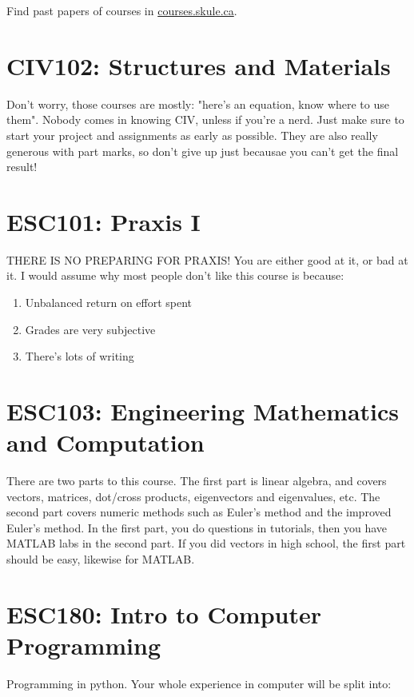 Find past papers of courses in \url{courses.skule.ca}.

\section{CIV102: Structures and Materials}

Don't worry, those courses are mostly: "here's an equation, know where to use them". Nobody comes in knowing CIV, unless if you're a nerd. Just make sure to start your project and assignments as early as possible. They are also really generous with part marks, so don't give up just becausae you can't get the final result!

\section{ESC101: Praxis I}

THERE IS NO PREPARING FOR PRAXIS! You are either good at it, or bad at it. I would assume why most people don't like this course is because:

\begin{enumerate}
    \item Unbalanced return on effort spent
    \item Grades are very subjective
    \item There's lots of writing
\end{enumerate}

\section{ESC103: Engineering Mathematics and Computation}

There are two parts to this course. The first part is linear algebra, and covers vectors, matrices, dot/cross products, eigenvectors and eigenvalues, etc. The second part covers numeric methods such as Euler's method and the improved Euler's method. In the first part, you do questions in tutorials, then you have MATLAB labs in the second part. If you did vectors in high school, the first part should be easy, likewise for MATLAB.

\section{ESC180: Intro to Computer Programming}

Programming in python. Your whole experience in computer will be split into:

